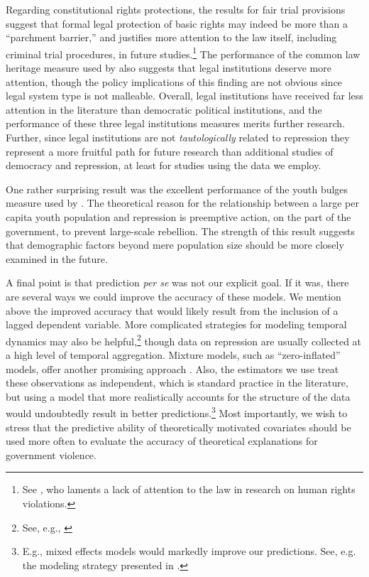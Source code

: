 \documentclass[12pt]{article}
\begin{document}
Regarding constitutional rights protections, the results for fair trial provisions suggest that formal legal protection of basic rights may indeed be more than a ``parchment barrier,'' \citep[See][]{KeithTatePoe2009} and justifies more attention to the law itself, including criminal trial procedures, in future studies.\footnote{See \citet{Cross1999}, who laments a lack of attention to the law in research on human rights violations.} The performance of the common law heritage measure used by \citet{Mitchell2013} also suggests that legal institutions deserve more attention, though the policy implications of this finding are not obvious since legal system type is not malleable. Overall, legal institutions have received far less attention in the literature than democratic political institutions, and the performance of these three legal institutions measures merits further research. Further, since legal institutions are not {\it tautologically} related to repression they represent a more fruitful path for future research than additional studies of democracy and repression, at least for studies using the data we employ. 

One rather surprising result was the excellent performance of the youth bulges measure used by \citet{NordasDavenport2013}. The theoretical reason for the relationship between a large per capita youth population and repression is preemptive action, on the part of the government, to prevent large-scale rebellion. The strength of this result suggests that demographic factors beyond mere population size should be more closely examined in the future. 

A final point is that prediction {\it per se} was not our explicit goal. If it was, there are several ways we could improve the accuracy of these models. We mention above the improved accuracy that would likely result from the inclusion of a lagged dependent variable. More complicated strategies for modeling temporal dynamics may also be helpful,\footnote{See, e.g., \citep{Brandtetal2011}} though data on repression are usually collected at a high level of temporal aggregation. Mixture models, such as ``zero-inflated'' models, offer another promising approach \citep[See, e.g.][]{Bagozzietal2013,Bagozzi2013}. Also, the estimators we use treat these observations as independent, which is standard practice in the literature, but using a model that more realistically accounts for the structure of the data would undoubtedly result in better predictions.\footnote{E.g., mixed effects models would markedly improve our predictions. See, e.g. the modeling strategy presented in \citet{Wardetal2012}.} Most importantly, we wish to stress that the predictive ability of theoretically motivated covariates should be used more often to evaluate the accuracy of theoretical explanations for government violence.
\end{document}
